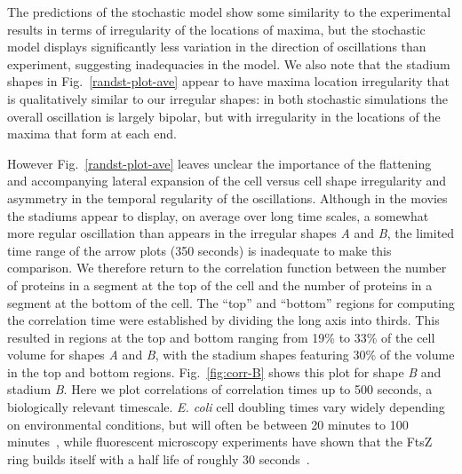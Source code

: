 \documentclass[10pt,letterpaper]{article}
\newcommand{\fixme}[1]{\red{[#1]}}
\newcommand{\changed}[1]{{\color{red}#1}}
\newcommand{\red}[1]{{\bf \color{red} #1}}
\begin{document}

The predictions of the stochastic model show some similarity to the
experimental results in terms of irregularity of the locations of
maxima, but the stochastic model displays significantly less
variation in the direction of oscillations than experiment, suggesting
inadequacies in the model.  We also note that the stadium shapes in
Fig.~\ref{randst-plot-ave} appear to have maxima location irregularity
that is qualitatively similar to our irregular shapes: in both
stochastic simulations the overall oscillation is largely bipolar, but
with irregularity in the locations of the maxima that form at each
end.

However Fig.~\ref{randst-plot-ave} leaves unclear the importance of
the flattening and accompanying lateral expansion of the cell versus
cell shape irregularity and asymmetry in the temporal regularity of
the oscillations.  Although in the movies the stadiums appear to
display, on average over long time scales, a somewhat more regular
oscillation than appears in the irregular shapes \emph{A} and
\emph{B}, the limited time range of the arrow plots (350 seconds) is
inadequate to make this comparison.  We therefore return to the
correlation function between the number of proteins in a segment at
the top of the cell and the number of proteins in a segment at the
bottom of the cell.  The ``top'' and ``bottom'' regions for computing
the correlation time were established by dividing the long axis into
thirds.  This resulted in regions at the top and bottom ranging from
19\% to 33\% of the cell volume for shapes \emph{A} and \emph{B}, with
the stadium shapes featuring 30\% of the volume in the top and bottom
regions.  Fig.~\ref{fig:corr-B} shows this plot for shape \emph{B} and
stadium \emph{B}.  Here we plot correlations of correlation times up
to 500 seconds, a biologically relevant timescale.  \changed{\emph{E. coli}} cell
doubling times vary widely depending on environmental conditions, but
will often be between 20 minutes to 100
minutes~\cite{pierucci1972chromosome}, while fluorescent microscopy
experiments have shown that the FtsZ ring builds itself with a half
life of roughly 30 seconds~\cite{stricker2002rapid}.
\end{document}

